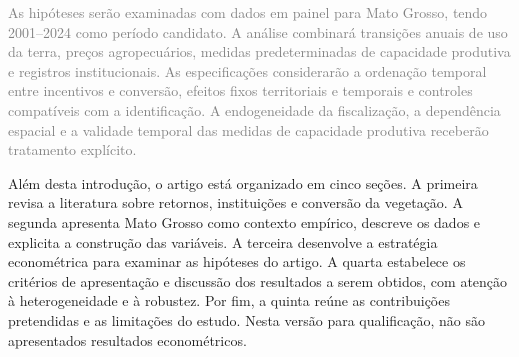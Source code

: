 
\textcolor{gray}{As hipóteses serão examinadas com dados em painel para Mato Grosso, tendo 2001--2024 como período candidato. A análise combinará transições anuais de uso da terra, preços agropecuários, medidas predeterminadas de capacidade produtiva e registros institucionais. As especificações considerarão a ordenação temporal entre incentivos e conversão, efeitos fixos territoriais e temporais e controles compatíveis com a identificação. A endogeneidade da fiscalização, a dependência espacial e a validade temporal das medidas de capacidade produtiva receberão tratamento explícito.}


Além desta introdução, o artigo está organizado em cinco seções. A primeira revisa a literatura sobre retornos, instituições e conversão da vegetação. A segunda apresenta Mato Grosso como contexto empírico, descreve os dados e explicita a construção das variáveis. A terceira desenvolve a estratégia econométrica para examinar as hipóteses do artigo. A quarta estabelece os critérios de apresentação e discussão dos resultados a serem obtidos, com atenção à heterogeneidade e à robustez. Por fim, a quinta reúne as contribuições pretendidas e as limitações do estudo. Nesta versão para qualificação, não são apresentados resultados econométricos.

